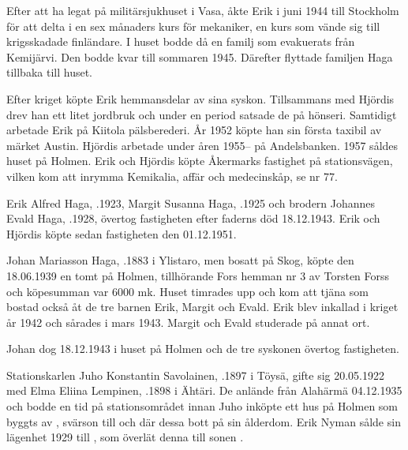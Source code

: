 Efter att ha legat på militärsjukhuset i Vasa, åkte Erik i juni 1944 till Stockholm för att delta i en sex månaders kurs för mekaniker, en kurs som vände sig till krigsskadade finländare. I huset bodde då en familj som evakuerats från Kemijärvi. Den bodde kvar till sommaren 1945. Därefter flyttade familjen Haga tillbaka till huset.

Efter kriget köpte Erik hemmansdelar av sina syskon. Tillsammans med Hjördis drev han ett litet jordbruk och under en period satsade de på  hönseri. Samtidigt arbetade Erik på Kiitola pälsberederi. År 1952 köpte han sin första taxibil av märket Austin. Hjördis arbetade under åren 1955-- på Andelsbanken. 1957 såldes huset på Holmen. Erik och Hjördis köpte Åkermarks fastighet på stationsvägen, vilken kom att inrymma Kemikalia, affär och medecinskåp, se nr 77.
\begin{jhchildren}
  \item {}
  \item {}
  \item {}
\end{jhchildren}


Erik Alfred Haga, .1923,  Margit Susanna Haga, .1925 och brodern Johannes Evald Haga, .1928, övertog fastigheten efter faderns död 18.12.1943. Erik och Hjördis köpte sedan fastigheten den 01.12.1951.


Johan Mariasson Haga, .1883 i Ylistaro, men bosatt på Skog, köpte den 18.06.1939 en tomt på Holmen, tillhörande Fors hemman nr 3 av Torsten Forss och köpesumman var 6000 mk. Huset timrades upp och kom att tjäna som bostad också åt de tre barnen Erik, Margit och Evald. Erik blev inkallad i kriget år 1942 och sårades i mars 1943. Margit och Evald studerade på annat ort.

Johan dog 18.12.1943 i huset på Holmen och de tre syskonen övertog fastigheten.





Stationskarlen Juho Konstantin Savolainen, .1897 i Töysä, gifte sig 20.05.1922 med Elma Eliina Lempinen, .1898 i Ähtäri. De anlände från Alahärmä 04.12.1935 och bodde en tid på stationsområdet innan Juho inköpte ett hus på Holmen som byggts av , svärson till  och där dessa bott på sin ålderdom. Erik Nyman sålde sin lägenhet 1929 till , som överlät denna till sonen .

